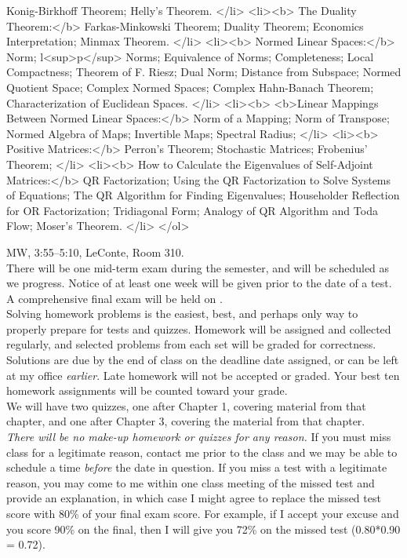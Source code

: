 \documentclass[12pt]{amsart}
\begin{document}
Konig-Birkhoff Theorem;
Helly's Theorem.
</li>
<li><b>
The Duality Theorem:</b>
Farkas-Minkowski Theorem;
Duality Theorem;
Economics Interpretation;
Minmax Theorem.
</li>
<li><b>
Normed Linear Spaces:</b>
Norm;
l<sup>p</sup> Norms;
Equivalence of Norms;
Completeness; 
Local Compactness;
Theorem of F. Riesz;
Dual Norm; 
Distance from Subspace; 
Normed Quotient Space; 
Complex Normed Spaces; 
Complex Hahn-Banach Theorem; 
Characterization of Euclidean Spaces. 
</li>
<li><b>
<b>Linear Mappings Between Normed Linear Spaces:</b>
Norm of a Mapping;
Norm of Transpose;
Normed Algebra of Maps;
Invertible Maps;
Spectral Radius;
</li>
<li><b>
Positive Matrices:</b>
Perron's Theorem;
Stochastic Matrices;
Frobenius' Theorem;
</li>
<li><b>
How to Calculate the Eigenvalues of Self-Adjoint Matrices:</b>
QR Factorization;
Using the QR Factorization to Solve Systems of Equations;
The QR Algorithm for Finding Eigenvalues; 
Householder Reflection for OR Factorization;
Tridiagonal Form; 
Analogy of QR Algorithm and Toda Flow; 
Moser's Theorem.
</li>
</ol>

 MW, 3:55--5:10, LeConte, Room 310. \\

 There will be one mid-term exam during the semester, and will be scheduled as we progress. Notice of at least one week will be given prior to the date of a
test. A comprehensive final exam will be held on .\\
 
 Solving homework problems is the easiest, best, and perhaps only way
to properly prepare for tests and quizzes.   Homework will be assigned and
collected regularly, and selected problems from each set will be graded for
correctness. Solutions are due by the end of class on the deadline date
assigned, or can be left at my office \emph{earlier}. Late homework will not be
accepted or graded. Your best ten homework assignments will be counted toward
your grade. \\ 

 We will have two quizzes, one after Chapter 1, covering
material from that chapter, and one after Chapter 3, covering the material from
that chapter.  \\

 \emph{There will be no make-up homework or quizzes for any
  reason.} If you must miss class for a legitimate reason, contact me prior to
the class and we may be able to schedule a time \emph{before} the date in
question. If you miss a test with a legitimate reason, you may come to me within
one class meeting of the missed test and provide an explanation, in which case I might
agree to replace the missed test score with 80\% of your final exam score.
For example, if I accept your excuse and you score 90\% on the final, then I
will give you 72\% on the missed test (0.80*0.90 = 0.72).\\
\end{document}
